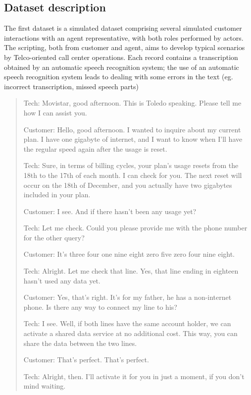 \subsection{Dataset description}
The first dataset is a simulated dataset comprising several simulated customer interactions with an agent representative, with both roles performed by actors. The scripting, both from customer and agent, aims to develop typical scenarios by Telco-oriented call center operations. Each record contains a transcription obtained by an automatic speech recognition system; the use of an automatic speech recognition system leads to dealing with some errors in the text (eg. incorrect transcription, missed speech parts)

\begin{quote}
      \label{transcription-nine}
      Tech: Movistar, good afternoon. This is Toledo speaking. Please tell me how I can assist you.

      Customer: Hello, good afternoon. I wanted to inquire about my current plan. I have one gigabyte of internet, and I want to know when I'll have the regular speed again after the usage is reset.

      Tech: Sure, in terms of billing cycles, your plan's usage resets from the 18th to the 17th of each month. I can check for you. The next reset will occur on the 18th of December, and you actually have two gigabytes included in your plan.

      Customer: I see. And if there hasn't been any usage yet?

      Tech: Let me check. Could you please provide me with the phone number for the other query?

      Customer: It's three four one nine eight zero five zero four nine eight.

      Tech: Alright. Let me check that line. Yes, that line ending in eighteen hasn't used any data yet.

      Customer: Yes, that's right. It's for my father, he has a non-internet phone. Is there any way to connect my line to his?

      Tech: I see. Well, if both lines have the same account holder, we can activate a shared data service at no additional cost. This way, you can share the data between the two lines.

      Customer: That's perfect. That's perfect.

      Tech: Alright, then. I'll activate it for you in just a moment, if you don't mind waiting.


\end{quote}

